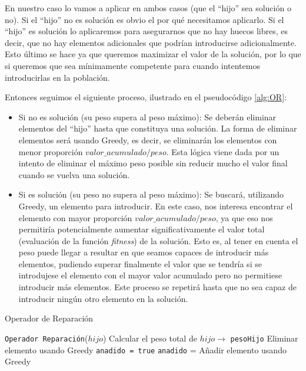 En nuestro caso lo vamos a aplicar en ambos casos (que el ``hijo'' sea solución o no). 
Si el ``hijo'' no es solución es obvio el por qué necesitamos aplicarlo. 
Si el ``hijo'' es solución lo aplicaremos para asegurarnos que no hay huecos libres, es decir, que no hay elementos adicionales que podrían introducirse adicionalmente. 
Esto último se hace ya que queremos maximizar el valor de la solución, por lo que si queremos que sea mínimamente competente para cuando intentemos introducirlas en la población. 

Entonces seguimos el siguiente proceso, ilustrado en el pseudocódigo \ref{alg:OR}:
\begin{itemize}
	\item Si no es solución (su peso supera al peso máximo): Se deberán eliminar elementos del ``hijo'' hasta que constituya una solución. 
La forma de eliminar elementos será usando Greedy, es decir, se eliminarán los elementos con menor proporción $valor\_acumulado/peso$. 
Esta lógica viene dada por un intento de eliminar el máximo peso posible sin reducir mucho el valor final cuando se vuelva una solución. 
	
	\item Si es solución (su peso no supera al peso máximo): Se buscará, utilizando Greedy, un elemento para introducir. 
En este caso, nos interesa encontrar el elemento con mayor proporción $valor\_acumulado/peso$, ya que eso nos permitiría potencialmente aumentar significativamente el valor total (evaluación de la función \textit{fitness}) de la solución. 
Esto es, al tener en cuenta el peso puede llegar a resultar en que seamos capaces de introducir más elementos, pudiendo superar finalmente el valor que se tendría si se introdujese el elemento con el mayor valor acumulado pero no permitiese introducir más elementos. 
Este proceso se repetirá hasta que no sea capaz de introducir ningún otro elemento en la solución. 
\end{itemize}


\begin{algorithm}
\caption{Operador de Reparación}\label{alg:OR}
\begin{algorithmic}[1]
\Procedure \texttt{Operador Reparación}($hijo$)
\State Calcular el peso total de $hijo \xrightarrow{}{}$ \texttt{pesoHijo}
		\State Eliminar elemento usando Greedy
	\EndWhile
\Else
	\State \texttt{anadido = true} 
		\State \texttt{anadido} = Añadir elemento usando Greedy
	\EndWhile
\EndIf
\EndProcedure
\end{algorithmic}
\end{algorithm}

